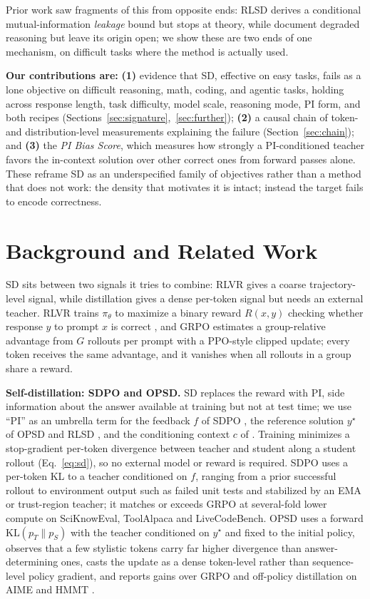 \documentclass{article}
\newcommand{\ysol}{y^{\star}}               %
\newcommand{\KL}{\mathrm{KL}}
\begin{document}
Prior work saw fragments of this from opposite ends: RLSD \citep{rlsd2025} derives a conditional mutual-information \textit{leakage} bound but stops at theory, while \citet{reasoning_degrades2025} document degraded reasoning but leave its origin open; we show these are two ends of one mechanism, on difficult tasks where the method is actually used. 

\textbf{Our contributions are:} \textbf{(1)} evidence that SD, effective on easy tasks, fails as a lone objective on difficult reasoning, math, coding, and agentic tasks, holding across response length, task difficulty, model scale, reasoning mode, PI form, and both recipes (Sections~\ref{sec:signature},~\ref{sec:further}); \textbf{(2)} a causal chain of token- and distribution-level measurements explaining the failure (Section~\ref{sec:chain}); and \textbf{(3)} the \textit{PI Bias Score}, which measures how strongly a PI-conditioned teacher favors the in-context solution over other correct ones from forward passes alone. These reframe SD as an underspecified family of objectives rather than a method that does not work: the density that motivates it is intact; instead the target fails to encode correctness.

\section{Background and Related Work}
\label{sec:background}
SD sits between two signals it tries to combine: RLVR gives a coarse trajectory-level signal, while distillation gives a dense per-token signal but needs an external teacher. RLVR trains $\pi_\theta$ to maximize a binary reward $R(x,y)$ checking whether response $y$ to prompt $x$ is correct \citep{rlvr2024}, and GRPO \citep{grpo2024} estimates a group-relative advantage from $G$ rollouts per prompt with a PPO-style clipped update; every token receives the same advantage, and it vanishes when all rollouts in a group share a reward.

\textbf{Self-distillation: SDPO and OPSD.} SD replaces the reward with PI, side information about the answer available at training but not at test time; we use ``PI'' as an umbrella term for the feedback $f$ of SDPO \citep{sdpo2025}, the reference solution $\ysol$ of OPSD \citep{opsd2025} and RLSD \citep{rlsd2025}, and the conditioning context $c$ of \citet{reasoning_degrades2025}. Training minimizes a stop-gradient per-token divergence between teacher and student along a student rollout (Eq.~\eqref{eq:sd}), so no external model or reward is required. SDPO uses a per-token KL to a teacher conditioned on $f$, ranging from a prior successful rollout to environment output such as failed unit tests and stabilized by an EMA or trust-region teacher; it matches or exceeds GRPO at several-fold lower compute on SciKnowEval, ToolAlpaca and LiveCodeBench. OPSD uses a forward $\KL(p_T\|p_S)$ with the teacher conditioned on $\ysol$ and fixed to the initial policy, observes that a few stylistic tokens carry far higher divergence than answer-determining ones, casts the update as a dense token-level rather than sequence-level policy gradient, and reports gains over GRPO and off-policy distillation on AIME \citep{aime2024, aime2025} and HMMT \citep{hmmt2024}.
\end{document}
